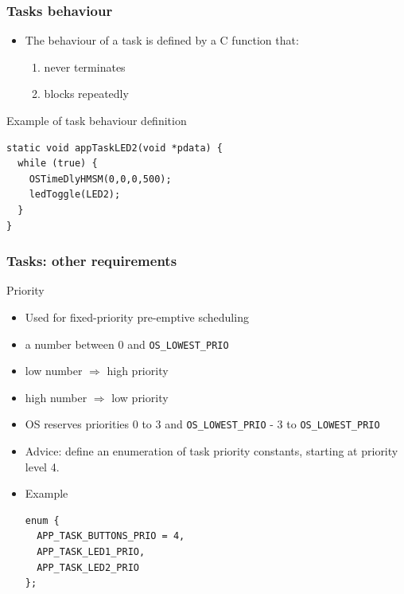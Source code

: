 \documentclass[hyperref={pdfpagelabels=false},svgnames]{beamer}
\begin{document}
\begin{frame}[fragile]
\frametitle{Tasks behaviour}
\begin{itemize}
\item The behaviour of a task is defined by a C function that:
\begin{enumerate}
\item never terminates
\item blocks repeatedly
\end{enumerate}
\end{itemize}

\begin{block}{Example of task behaviour definition}

\begin{lstlisting}
static void appTaskLED2(void *pdata) {
  while (true) {                
    OSTimeDlyHMSM(0,0,0,500);   
    ledToggle(LED2);
  } 
}
\end{lstlisting}

\end{block}
\end{frame}


\begin{frame}[fragile]
\frametitle{Tasks: other requirements}
\begin{block}{Priority}
\begin{itemize}
\item Used for fixed-\alert{priority} pre-emptive scheduling
\item a number between 0 and \verb'OS_LOWEST_PRIO'
\item \alert{low} number $\Rightarrow$ \alert{high} priority
\item \alert{high} number $\Rightarrow$ \alert{low} priority
\item OS reserves priorities 0 to 3 and \verb'OS_LOWEST_PRIO' - 3 to \verb'OS_LOWEST_PRIO'
\item Advice: define an enumeration of task priority constants, starting at
priority level 4.
\item Example
\begin{lstlisting}
enum {
  APP_TASK_BUTTONS_PRIO = 4,
  APP_TASK_LED1_PRIO,
  APP_TASK_LED2_PRIO
};
\end{lstlisting}
\end{itemize}
\end{block}
\end{frame}
\end{document}
